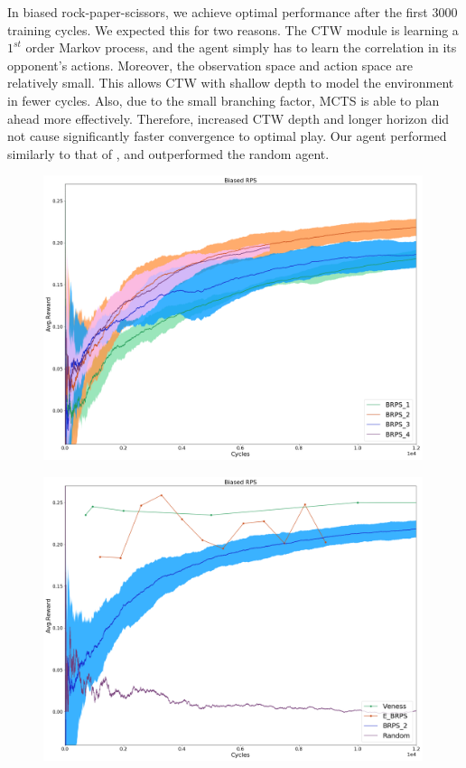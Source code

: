 \documentclass{article}
\theoremstyle{definition}
\newtheorem{primary statistics}[definition]{Primary Statistics}
\newtheorem{auxiliary statistics}[definition]{Auxiliary Statistics}
\begin{document}
 In biased rock-paper-scissors, we achieve optimal performance after the first 3000 training cycles. We expected this for two reasons. The CTW module is learning a $1^{st}$ order Markov process, and the agent simply has to learn the correlation in its opponent’s actions. Moreover, the observation space and action space are relatively small. This allows CTW with shallow depth to model the environment in fewer cycles. Also, due to the small branching factor, MCTS is able to plan ahead more effectively. Therefore, increased CTW depth and longer horizon did not cause significantly faster convergence to optimal play. Our agent performed similarly to that of \cite{veness2011monte}, and outperformed the random agent.

 \begin{figure}[!htb]
 \centering
    \includegraphics[width=11.1cm]{4_Biased_RPS}
\end{figure}

\begin{figure}[!htb]
\centering
    \includegraphics[width=11.1cm]{Biased_RPS}
\end{figure}
\end{document}
